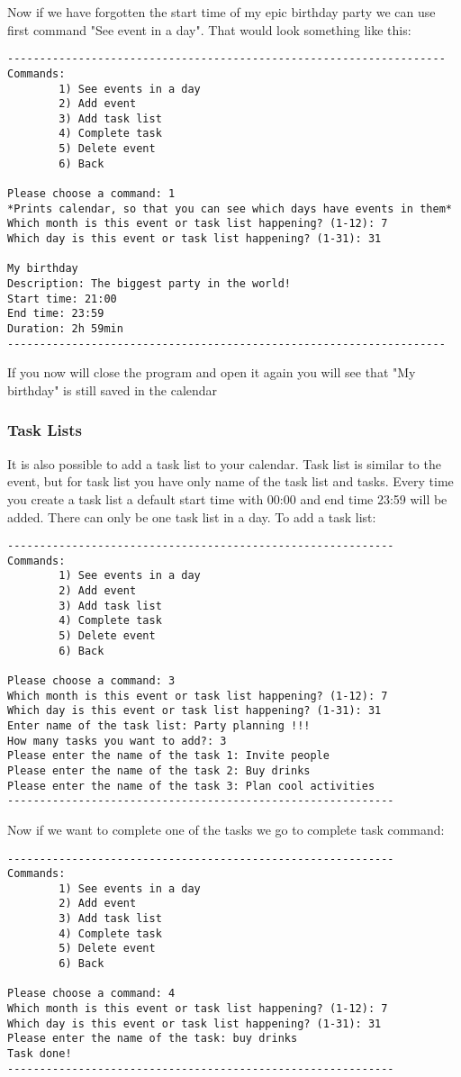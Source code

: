 \documentclass[a4paper, 12pt]{article}
\begin{document}
Now if we have forgotten the start time of my epic birthday party we can use first command "See event in a day". That would look something like this:
\begin{verbatim}
--------------------------------------------------------------------
Commands:
        1) See events in a day
        2) Add event
        3) Add task list
        4) Complete task
        5) Delete event
        6) Back
                    
Please choose a command: 1
*Prints calendar, so that you can see which days have events in them*
Which month is this event or task list happening? (1-12): 7
Which day is this event or task list happening? (1-31): 31

My birthday
Description: The biggest party in the world!
Start time: 21:00
End time: 23:59
Duration: 2h 59min
--------------------------------------------------------------------
     \end{verbatim}
If you now will close the program and open it again you will see that "My birthday" is still saved in the calendar

    \subsubsection{Task Lists}
It is also possible to add a task list to your calendar. Task list is similar to the event, but for task list you have only name of the task list and tasks. Every time you create a task list a default start time with 00:00 and end time 23:59 will be added. There can only be one task list in a day. To add a task list:
\begin{verbatim}
------------------------------------------------------------
Commands:
        1) See events in a day
        2) Add event
        3) Add task list
        4) Complete task
        5) Delete event
        6) Back
                    
Please choose a command: 3
Which month is this event or task list happening? (1-12): 7
Which day is this event or task list happening? (1-31): 31
Enter name of the task list: Party planning !!!
How many tasks you want to add?: 3
Please enter the name of the task 1: Invite people
Please enter the name of the task 2: Buy drinks
Please enter the name of the task 3: Plan cool activities
------------------------------------------------------------
\end{verbatim}
Now if we want to complete one of the tasks we go to complete task command:
\begin{verbatim}
------------------------------------------------------------
Commands:
        1) See events in a day
        2) Add event
        3) Add task list
        4) Complete task
        5) Delete event
        6) Back
                    
Please choose a command: 4
Which month is this event or task list happening? (1-12): 7
Which day is this event or task list happening? (1-31): 31
Please enter the name of the task: buy drinks
Task done!
------------------------------------------------------------
\end{verbatim}
\end{document}
